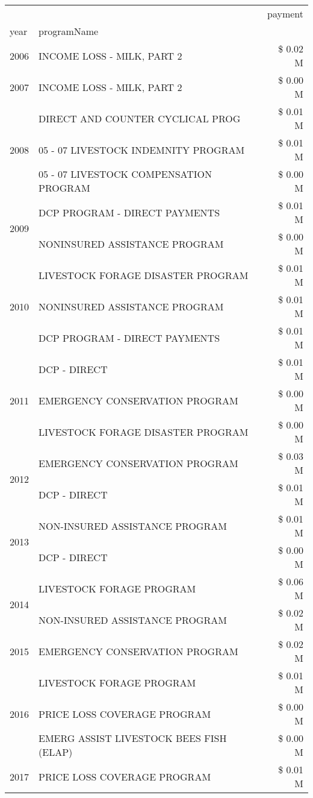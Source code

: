\begin{tabular}{llr}
\toprule
 &  & payment \\
year & programName &  \\
\midrule
2006 & INCOME LOSS - MILK, PART 2 & \$ 0.02 M \\
\cline{1-3}
2007 & INCOME LOSS - MILK, PART 2 & \$ 0.00 M \\
\cline{1-3}
\multirow[t]{3}{*}{2008} & DIRECT AND COUNTER CYCLICAL PROG & \$ 0.01 M \\
 & 05 - 07 LIVESTOCK INDEMNITY PROGRAM & \$ 0.01 M \\
 & 05 - 07 LIVESTOCK COMPENSATION PROGRAM & \$ 0.00 M \\
\cline{1-3}
\multirow[t]{2}{*}{2009} & DCP PROGRAM - DIRECT PAYMENTS & \$ 0.01 M \\
 & NONINSURED ASSISTANCE PROGRAM & \$ 0.00 M \\
\cline{1-3}
\multirow[t]{3}{*}{2010} & LIVESTOCK FORAGE DISASTER  PROGRAM & \$ 0.01 M \\
 & NONINSURED ASSISTANCE PROGRAM & \$ 0.01 M \\
 & DCP PROGRAM - DIRECT PAYMENTS & \$ 0.01 M \\
\cline{1-3}
\multirow[t]{3}{*}{2011} & DCP - DIRECT & \$ 0.01 M \\
 & EMERGENCY CONSERVATION PROGRAM & \$ 0.00 M \\
 & LIVESTOCK FORAGE DISASTER PROGRAM & \$ 0.00 M \\
\cline{1-3}
\multirow[t]{2}{*}{2012} & EMERGENCY CONSERVATION PROGRAM & \$ 0.03 M \\
 & DCP - DIRECT & \$ 0.01 M \\
\cline{1-3}
\multirow[t]{2}{*}{2013} & NON-INSURED ASSISTANCE PROGRAM & \$ 0.01 M \\
 & DCP - DIRECT & \$ 0.00 M \\
\cline{1-3}
\multirow[t]{2}{*}{2014} & LIVESTOCK FORAGE PROGRAM & \$ 0.06 M \\
 & NON-INSURED ASSISTANCE PROGRAM & \$ 0.02 M \\
\cline{1-3}
2015 & EMERGENCY CONSERVATION PROGRAM & \$ 0.02 M \\
\cline{1-3}
\multirow[t]{3}{*}{2016} & LIVESTOCK FORAGE PROGRAM & \$ 0.01 M \\
 & PRICE LOSS COVERAGE PROGRAM & \$ 0.00 M \\
 & EMERG ASSIST LIVESTOCK BEES FISH (ELAP) & \$ 0.00 M \\
\cline{1-3}
\multirow[t]{2}{*}{2017} & PRICE LOSS COVERAGE PROGRAM & \$ 0.01 M \\

\end{tabular}
